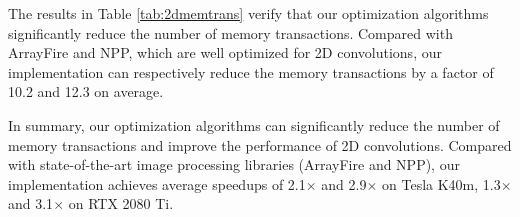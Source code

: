 The results in Table \ref{tab:2dmemtrans} verify that our optimization algorithms significantly reduce the number of memory transactions.
Compared with ArrayFire and NPP, which are well optimized for 2D convolutions, our implementation can respectively reduce the memory transactions by a factor of 10.2 and 12.3 on average.




In summary, our optimization algorithms can significantly reduce the number of memory transactions and improve the performance of 2D
convolutions. Compared with state-of-the-art image processing libraries (ArrayFire and NPP), our implementation achieves average speedups of 2.1$\times$ and 2.9$\times$ on Tesla K40m, 1.3$\times$ and 3.1$\times$ on RTX 2080 Ti.

